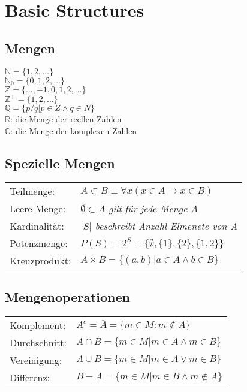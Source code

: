 \section{Basic Structures}

\subsection{Mengen}
$ \mathbb{N} = \{1, 2, \dots \} $ \\
$ \mathbb{N}_0 = \{0, 1, 2, \dots \} $ \\
$ \mathbb{Z} = \{ \dots , -1, 0, 1, 2, \dots \} $ \\
$ \mathbb{Z}^+ = \{1, 2, \dots \} $ \\
$ \mathbb{Q} = \{ p / q | p \in Z \land q \in N \} $ \\
$ \mathbb{R} $: die Menge der reellen Zahlen \\
$ \mathbb{C} $: die Menge der komplexen Zahlen \\

\subsection{Spezielle Mengen}
\begin{tabular}{ll}
    Teilmenge: & $ A \subset B \equiv \forall x (x \in A \rightarrow x \in B) $ \\
    Leere Menge: & $ \emptyset \subset A $ \textit{gilt für jede Menge A} \\
    Kardinalität: & $ |S| $ \textit{beschreibt Anzahl Elmenete von A} \\
    Potenzmenge: & $ P(S) = 2^S = \{ \emptyset , \{1\} , \{2\} , \{1, 2\} \} $ \\
    Kreuzprodukt: & $A \times B = \{(a, b) |a \in A \land b \in B \} $ \\
\end{tabular} 

\subsection{Mengenoperationen}
\begin{tabular}{ll}
    Komplement: & $ A^c = \overline{A} = \{ m \in M : m \notin A \} $ \\
    Durchschnitt: & $ A \cap B = \{ m \in M | m \in A \land m \in B \} $ \\
    Vereinigung: & $ A \cup B = \{ m \in M | m \in A \lor m \in B \} $ \\
    Differenz: & $ B - A = \{ m \in M | m \in B \land m \notin A \} $
\end{tabular} 

